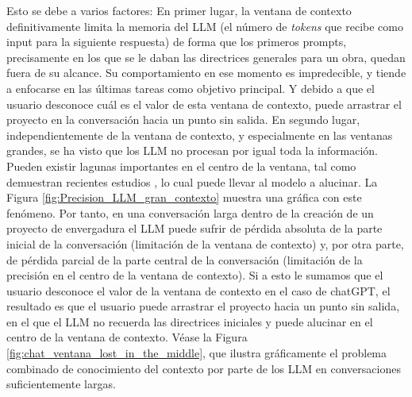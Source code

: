 Esto se debe a varios factores: En primer lugar, la ventana de contexto definitivamente limita la memoria del LLM (el número de \textit{tokens} que recibe como input para la siguiente respuesta) de forma que los primeros prompts, precisamente en los que se le daban las directrices generales para un obra, quedan fuera de su alcance. Su comportamiento en ese momento es impredecible, y tiende a enfocarse en las últimas tareas como objetivo principal. Y debido a que el usuario desconoce cuál es el valor de esta ventana de contexto, puede arrastrar el proyecto en la conversación hacia un punto sin salida. En segundo lugar, independientemente de la ventana de contexto, y especialmente en las ventanas grandes, se ha visto que los LLM no procesan por igual toda la información. Pueden existir lagunas importantes en el centro de la ventana, tal como demuestran recientes estudios \citep{liuLostMiddleHow2023}, lo cual puede llevar al modelo a alucinar. La Figura \ref{fig:Precision_LLM_gran_contexto} muestra una gráfica con este fenómeno. Por tanto, en una conversación larga dentro de la creación de un proyecto de envergadura el LLM puede sufrir de pérdida absoluta de la parte inicial de la conversación (limitación de la ventana de contexto) y, por otra parte, de pérdida parcial de la parte central de la conversación (limitación de la precisión en el centro de la ventana de contexto). Si a esto le sumamos que el usuario desconoce el valor de la ventana de contexto en el caso de chatGPT, el resultado es que el usuario puede arrastrar el proyecto hacia un punto sin salida, en el que el LLM no recuerda las directrices iniciales y puede alucinar en el centro de la ventana de contexto. Véase la Figura \ref{fig:chat_ventana_lost_in_the_middle}, que ilustra gráficamente el problema combinado de conocimiento del contexto por parte de los LLM en conversaciones suficientemente largas.


